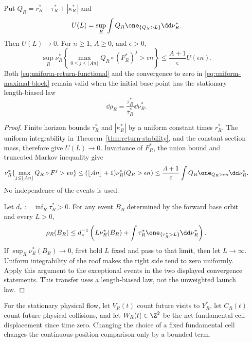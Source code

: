 \begin{lemma}
\label{lem:uniform-maximal-block}
Put $Q_R=r_R^*+\tau_R^*+|\kappa_R^*|$ and
\[
 U(L)=\sup_R\int Q_R\one_{\{Q_R>L\}}\dd\nu_R^*.
\]
Then $U(L)\to0$. For $n\ge1$, $A\ge0$, and $\epsilon>0$,
\begin{equation}\label{eq:uniform-maximal-block}
 \sup_R\nu_R^*\left\{
 \max_{0\le j\le\lfloor An\rfloor}Q_R\circ(F_R^*)^j>\epsilon n
 \right\}\le\frac{A+1}{\epsilon}U(\epsilon n).
\end{equation}
Both \eqref{eq:uniform-return-functional} and the convergence to zero
in \eqref{eq:uniform-maximal-block} remain valid when the initial
base point has the stationary length-biased law
\begin{equation}\label{eq:length-biased-base-v4}
 \dd\rho_R=\frac{\tau_R^*}{\bar\tau_R^*}\dd\nu_R^*.
\end{equation}
\end{lemma}
\begin{proof}
Finite horizon bounds $\tau_R^*$ and $|\kappa_R^*|$ by a uniform
constant times $r_R^*$. The uniform integrability in
Theorem~\ref{thm:return-stability}, and the constant section mass,
therefore give $U(L)\to0$. Invariance of $F_R^*$, the union bound
and truncated Markov inequality give
\[
 \nu_R^*\{\max_{j\le\lfloor An\rfloor}Q_R\circ F^j>\epsilon n\}
 \le (\lfloor An\rfloor+1)\nu_R^*(Q_R>\epsilon n)
 \le\frac{A+1}{\epsilon}\int Q_R\one_{Q_R>\epsilon n}\dd\nu_R^*.
\]
No independence of the events is used.

Let $d_*:=\inf_R\bar\tau_R^*>0$. For any event $B_R$ determined
by the forward base orbit and every $L>0$,
\begin{equation}\label{eq:length-bias-transfer-v4}
 \rho_R(B_R)\le d_*^{-1}\left(
 L\nu_R^*(B_R)+\int\tau_R^*\one_{\{\tau_R^*>L\}}\dd\nu_R^*\right).
\end{equation}
If $\sup_R\nu_R^*(B_R)\to0$, first hold $L$ fixed and pass to that
limit, then let $L\to\infty$. Uniform integrability of the roof
makes the right side tend to zero uniformly. Apply this argument to
the exceptional events in the two displayed convergence statements.
This transfer uses a length-biased law, not the unweighted launch law.
\end{proof}

For the stationary physical flow, let $V_R(t)$ count future visits to
$Y_R^*$, let $C_R(t)$ count future physical collisions, and let
$W_R(t)\in\Z^2$ be the net fundamental-cell displacement since time
zero. Changing the choice of a fixed fundamental cell changes the
continuous-position comparison only by a bounded term.

